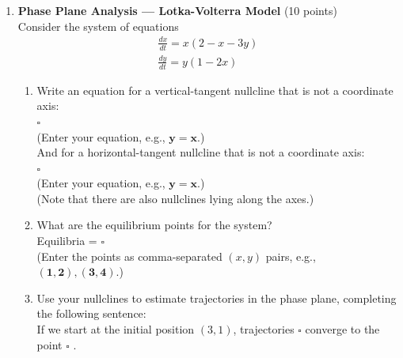 \begin{enumerate}
  \item \textbf{Phase Plane Analysis --- Lotka-Volterra Model} (10 points)\\
  Consider the system of equations
  $$
  \begin{gathered}
  \frac{d x}{d t}=x(2-x-3 y) \\
  \frac{d y}{d t}=y(1-2 x)
  \end{gathered}
  $$
  \begin{enumerate}[label=\alph*]
    \item Write an equation for a vertical-tangent nullcline that is not a coordinate axis:\\
    $\square$\\
    (Enter your equation, e.g., $\boldsymbol{y}=\boldsymbol{x}$.)\\
    And for a horizontal-tangent nullcline that is not a coordinate axis:\\
    $\square$\\
    (Enter your equation, e.g., $\boldsymbol{y}=\boldsymbol{x}$.)\\
    (Note that there are also nullclines lying along the axes.)\\
    \begin{subanswer}
    \end{subanswer}
    \item What are the equilibrium points for the system?\\
    Equilibria = $\square$\\
    (Enter the points as comma-separated $(x, y)$ pairs, e.g., $(\mathbf{1 , 2}),(\mathbf{3 , 4})$.)\\
    \begin{subanswer}
    \end{subanswer}
    \item Use your nullclines to estimate trajectories in the phase plane, completing the following sentence:\\
    If we start at the initial position $(3,1)$, trajectories $\square$ converge to the point $\square$ .\\
    \begin{subanswer}
    \end{subanswer}
  \end{enumerate}

  \newpage


\end{enumerate}
